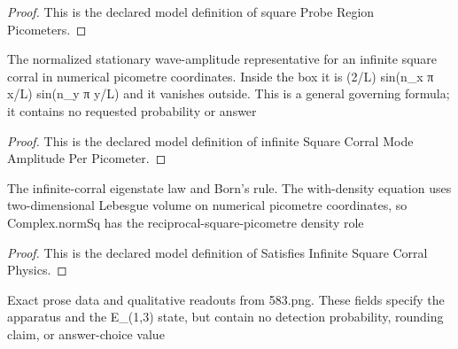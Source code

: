 \begin{proof}
  This is the declared model definition of square Probe Region Picometers.
\end{proof}
\begin{definition}
  \label{def:physics:phyx-mini-0583:phyxminiproblems-problemphyxmini0583-infinitesquarecorralmodeamplitudeperpicometer}
  The normalized stationary wave-amplitude representative for an infinite square corral in numerical picometre coordinates. Inside the box it is (2/L) sin(n\_x π x/L) sin(n\_y π y/L) and it vanishes outside. This is a general governing formula; it contains no requested probability or answer
\end{definition}
\begin{proof}
  This is the declared model definition of infinite Square Corral Mode Amplitude Per Picometer.
\end{proof}
\begin{definition}
  \label{def:physics:phyx-mini-0583:phyxminiproblems-problemphyxmini0583-satisfiesinfinitesquarecorralphysics}
  The infinite-corral eigenstate law and Born's rule. The with-density equation uses two-dimensional Lebesgue volume on numerical picometre coordinates, so Complex.normSq has the reciprocal-square-picometre density role
\end{definition}
\begin{proof}
  This is the declared model definition of Satisfies Infinite Square Corral Physics.
\end{proof}
\begin{definition}
  \label{def:physics:phyx-mini-0583:phyxminiproblems-problemphyxmini0583-matchesproblemstatementandfigure}
  Exact prose data and qualitative readouts from 583.png. These fields specify the apparatus and the E\_(1,3) state, but contain no detection probability, rounding claim, or answer-choice value
\end{definition}
